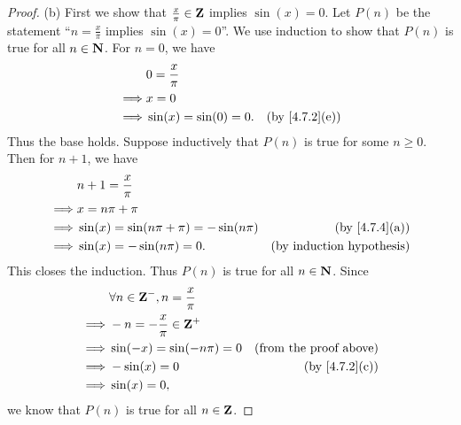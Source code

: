 \begin{proof}{(b)}
  First we show that \(\frac{x}{\pi} \in \mathbf{Z}\) implies \(\sin(x) = 0\).
  Let \(P(n)\) be the statement ``\(n = \frac{x}{\pi}\) implies \(\sin(x) = 0\)''.
  We use induction to show that \(P(n)\) is true for all \(n \in \mathbf{N}\).
  For \(n = 0\), we have
  \begin{align*}
             & 0 = \frac{x}{\pi}                                    \\
    \implies & x = 0                                                \\
    \implies & \sin(x) = \sin(0) = 0. & \text{(by \cref{4.7.2}(e))}
  \end{align*}
  Thus the base holds.
  Suppose inductively that \(P(n)\) is true for some \(n \geq 0\).
  Then for \(n + 1\), we have
  \begin{align*}
             & n + 1 = \frac{x}{\pi}                                                         \\
    \implies & x = n \pi + \pi                                                               \\
    \implies & \sin(x) = \sin(n \pi + \pi) = -\sin(n \pi) & \text{(by \cref{4.7.4}(a))}      \\
    \implies & \sin(x) = -\sin(n \pi) = 0.                & \text{(by induction hypothesis)}
  \end{align*}
  This closes the induction.
  Thus \(P(n)\) is true for all \(n \in \mathbf{N}\).
  Since
  \begin{align*}
             & \forall n \in \Z^-, n = \frac{x}{\pi}                                 \\
    \implies & -n = -\frac{x}{\pi} \in \Z^+                                          \\
    \implies & \sin(-x) = \sin(- n \pi) = 0          & \text{(from the proof above)} \\
    \implies & -\sin(x) = 0                          & \text{(by \cref{4.7.2}(c))}   \\
    \implies & \sin(x) = 0,
  \end{align*}
  we know that \(P(n)\) is true for all \(n \in \mathbf{Z}\).


\end{proof}
